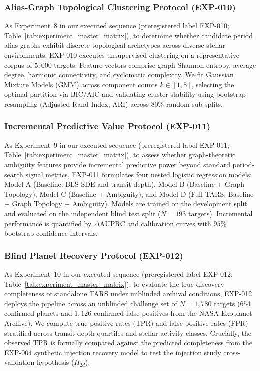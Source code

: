 \subsubsection{Alias-Graph Topological Clustering Protocol (EXP-010)} \label{sec:method_exp010_protocol}
As Experiment~8 in our executed sequence (preregistered label EXP-010; Table~\ref{tab:experiment_master_matrix}), to determine whether candidate period alias graphs exhibit discrete topological archetypes across diverse stellar environments, EXP-010 executes unsupervised clustering on a representative corpus of $5{,}000$ targets. Feature vectors comprise graph Shannon entropy, average degree, harmonic connectivity, and cyclomatic complexity. We fit Gaussian Mixture Models (GMM) across component counts $k \in [1, 8]$, selecting the optimal partition via BIC/AIC and validating cluster stability using bootstrap resampling (Adjusted Rand Index, ARI) across 80\% random sub-splits.

\subsubsection{Incremental Predictive Value Protocol (EXP-011)} \label{sec:method_exp011_protocol}
As Experiment~9 in our executed sequence (preregistered label EXP-011; Table~\ref{tab:experiment_master_matrix}), to assess whether graph-theoretic ambiguity features provide incremental predictive power beyond standard period-search signal metrics, EXP-011 formulates four nested logistic regression models: Model A (Baseline: BLS SDE and transit depth), Model B (Baseline + Graph Topology), Model C (Baseline + Ambiguity), and Model D (Full TARS: Baseline + Graph Topology + Ambiguity). Models are trained on the development split and evaluated on the independent blind test split ($N=193$ targets). Incremental performance is quantified by $\Delta\text{AUPRC}$ and calibration curves with $95\%$ bootstrap confidence intervals.

\subsubsection{Blind Planet Recovery Protocol (EXP-012)} \label{sec:method_exp012_protocol}
As Experiment~10 in our executed sequence (preregistered label EXP-012; Table~\ref{tab:experiment_master_matrix}), to evaluate the true discovery completeness of standalone TARS under unblinded archival conditions, EXP-012 deploys the pipeline across an unblinded challenge set of $N = 1{,}780$ targets ($654$ confirmed planets and $1{,}126$ confirmed false positives from the NASA Exoplanet Archive). We compute true positive rates (TPR) and false positive rates (FPR) stratified across transit depth quartiles and stellar activity classes. Crucially, the observed TPR is formally compared against the predicted completeness from the EXP-004 synthetic injection recovery model to test the injection study cross-validation hypothesis ($H_{2d}$).

